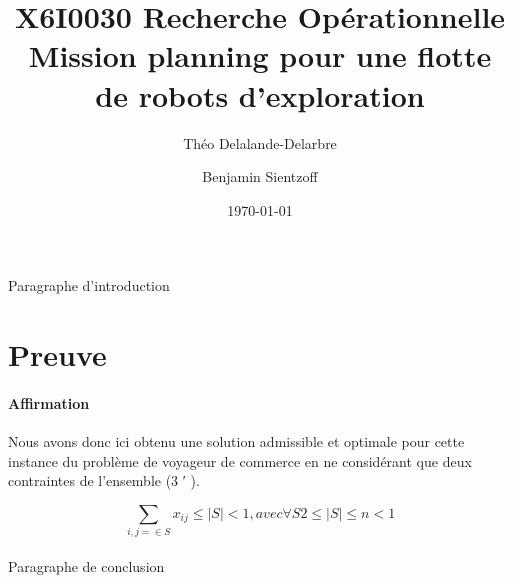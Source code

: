 \documentclass[a4paper,11pt]{article}
\title{\textsc{X6I0030} Recherche Opérationnelle \\ Mission planning pour une flotte de robots d’exploration}
\author{Théo Delalande-Delarbre \and Benjamin Sientzoff}
\date{\today}
\begin{document}
\maketitle

\newpage
\tableofcontents

\paragraph{}{
	Paragraphe d'introduction
}

\section{Preuve} %

\paragraph{Affirmation}{
	Nous avons donc ici obtenu une solution admissible et optimale pour cette instance du problème de voyageur de commerce en ne considérant que deux contraintes de l’ensemble (3 ′ ).
}

\begin{equation}
	\sum_{i,j= \in S} x_{ij} \leq |S| \less 1 , avec \forall S 2 \leq |S| \leq n \less 1
\end{equation}


\newpage

\paragraph{}{
	Paragraphe de conclusion
}
\end{document}
